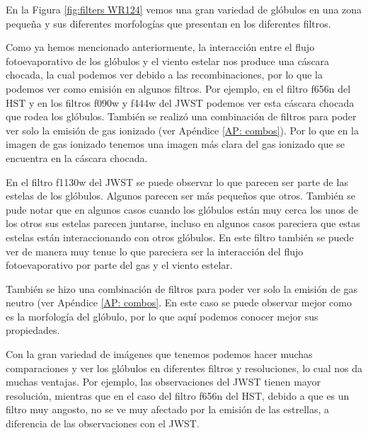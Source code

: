 \documentclass{book}
\begin{document}
En la Figura \ref{fig:filters WR124} vemos una gran variedad de glóbulos en una zona pequeña y sus diferentes morfologías que presentan en los diferentes filtros. 

Como ya hemos mencionado anteriormente, la interacción entre el flujo fotoevaporativo de los glóbulos y el viento estelar nos produce una cáscara chocada, la cual podemos ver debido a las recombinaciones, por lo que la podemos ver como emisión en algunos filtros. Por ejemplo, en el filtro f656n del HST y en los filtros f090w y f444w del JWST podemos ver esta cáscara chocada que rodea los glóbulos. También se realizó una combinación de filtros para poder ver solo la emisión de gas ionizado (ver Apéndice \ref{AP: combos}). Por lo que en la imagen de gas ionizado tenemos una imagen más clara del gas ionizado que se encuentra en la cáscara chocada.

En el filtro f1130w del JWST se puede observar lo que parecen ser parte de las estelas de los glóbulos. Algunos parecen ser más pequeños que otros. También se pude notar que en algunos casos cuando los glóbulos están muy cerca los unos de los otros sus estelas parecen juntarse, incluso en algunos casos pareciera que estas estelas están interaccionando con otros glóbulos. En este filtro también se puede ver de manera muy tenue lo que pareciera ser la interacción del flujo fotoevaporativo por parte del gas y el viento estelar.

También se hizo una combinación de filtros para poder ver solo la emisión de gas neutro (ver Apéndice \ref{AP: combos}. En este caso se puede observar mejor como es la morfología del glóbulo, por lo que aquí podemos conocer mejor sus propiedades.

Con la gran variedad de imágenes que tenemos podemos hacer muchas comparaciones y ver los glóbulos en diferentes filtros y resoluciones, lo cual nos da muchas ventajas. Por ejemplo, las observaciones del JWST tienen mayor resolución, mientras que en el caso del filtro f656n del HST, debido a que es un filtro muy angosto, no se ve muy afectado por la emisión de las estrellas, a diferencia de las observaciones con el JWST.
\end{document}
